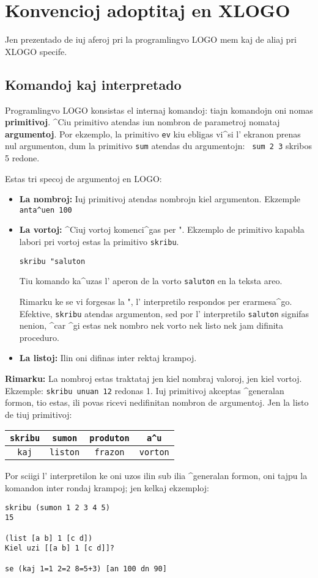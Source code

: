 \chapter{Konvencioj adoptitaj en XLOGO}
Jen prezentado de iuj aferoj pri la programlingvo LOGO mem kaj de
aliaj pri XLOGO specife.

\section{Komandoj kaj interpretado}
Programlingvo LOGO konsistas el internaj komandoj: tiajn komandojn oni
nomas \textbf{primitivoj}.  ^Ciu primitivo atendas iun nombron de
parametroj nomataj \textbf{argumentoj}.  Por ekzemplo, la primitivo
\texttt{ev} kiu ebligas vi^si l' ekranon prenas nul argumenton, dum la
primitivo \texttt{sum} atendas du argumentojn: \texttt{ sum 2 3}
skribos 5 redone.

Estas tri specoj de argumentoj en LOGO:
\begin{itemize}
\item \textbf{La nombroj:} Iuj primitivoj atendas nombrojn kiel
  argumenton.  Ekzemple \texttt{anta^uen 100}
\item \textbf{La vortoj:} ^Ciuj vortoj komenci^gas per ".  Ekzemplo de
  primitivo kapabla labori pri vortoj estas la primitivo
  \texttt{skribu}.
\begin{center}
\texttt{skribu "saluton} 
\end{center}
Tiu komando ka^uzas l' aperon de la vorto \texttt{saluton} en la
teksta areo.

Rimarku ke se vi forgesas la ", l' interpretilo respondos per
erarmesa^go.  Efektive, \texttt{skribu} atendas argumenton, sed por l'
interpretilo \texttt{saluton} signifas nenion, ^car ^gi estas nek
nombro nek vorto nek listo nek jam difinita proceduro.
\item\textbf{La listoj:} Ilin oni difinas inter rektaj krampoj.
\end{itemize}
\vspace{0.5cm} \textbf{Rimarku:} La nombroj estas traktataj jen kiel
nombraj valoroj, jen kiel vortoj.  Ekzemple: \texttt{skribu unuan 12}
redonas 1.  Iuj primitivoj akceptas ^generalan formon, tio estas, ili
povas ricevi nedifinitan nombron de argumentoj.  Jen la listo de tiuj
primitivoj:
\begin{center}
  \begin{tabular}{cccc}
    \texttt{skribu} & \texttt{sumon}&\texttt{produton} &\texttt{a^u}\\
    \hline
    \texttt{kaj}&\texttt{liston}&\texttt{frazon}& \texttt{vorton}\\
  \end{tabular} 
\end{center}
Por sciigi l' interpretilon ke oni uzos ilin sub ilia ^generalan
formon, oni tajpu la komandon inter rondaj krampoj; jen kelkaj
ekzemploj:
\begin{verbatim}
skribu (sumon 1 2 3 4 5)
15

(list [a b] 1 [c d])
Kiel uzi [[a b] 1 [c d]]?

se (kaj 1=1 2=2 8=5+3) [an 100 dn 90]
\end{verbatim}

